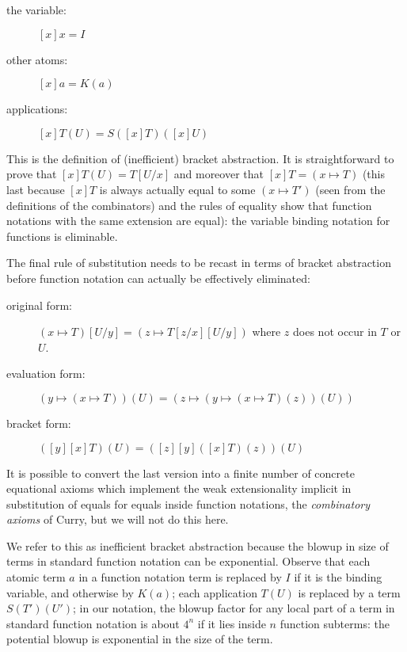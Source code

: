 \documentclass{article}
\begin{document}
\begin{description}

\item[the variable:]  $[x]x = I$

\item[other atoms:] $[x]a = K(a)$

\item[applications:] $[x]T(U) = S([x]T)([x]U)$

\end{description}

This is the definition of (inefficient) bracket abstraction.  It is
straightforward to prove that $[x]T(U) = T[U/x]$ and moreover that
$[x]T = (x \mapsto T)$ (this last because $[x]T$ is always actually
equal to some $(x \mapsto T')$ (seen from the definitions of the
combinators) and the rules of equality show that function notations
with the same extension are equal): the variable binding notation for
functions is eliminable.

The final rule of substitution needs to be recast in terms of bracket
abstraction before function notation can actually be effectively eliminated:

\begin{description}

\item[original form:] $(x \mapsto T)[U/y] = (z \mapsto T[z/x][U/y])$ where $z$ does
not occur in $T$ or $U$.

\item[evaluation form:] $(y \mapsto (x \mapsto T))(U) = (z \mapsto (y \mapsto (x \mapsto T)(z))(U))$

\item[bracket form:]  $([y][x]T)(U) = ([z][y]([x]T)(z))(U)$


\end{description}

It is possible to convert the last version into a finite number of
concrete equational axioms which implement the weak extensionality
implicit in substitution of equals for equals inside function
notations, the {\em combinatory axioms\/} of Curry, but we will not do
this here.

We refer to this as inefficient bracket abstraction because the blowup
in size of terms in standard function notation can be exponential.
Observe that each atomic term $a$ in a function notation term is
replaced by $I$ if it is the binding variable, and otherwise by
$K(a)$; each application $T(U)$ is replaced by a term $S(T')(U')$; in
our notation, the blowup factor for any local part of a term in
standard function notation is about $4^n$ if it lies inside $n$
function subterms: the potential blowup is exponential in the size of
the term.
\end{document}
